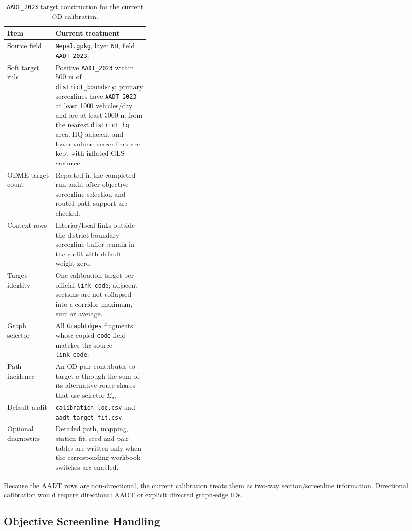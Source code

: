 \documentclass[11pt,a4paper]{article}
\begin{document}
\begin{table}[H]
\centering
\caption{\texttt{AADT\_2023} target construction for the current OD calibration.}
\begin{tabularx}{\linewidth}{p{0.34\linewidth} X}
\toprule
\textbf{Item} & \textbf{Current treatment} \\
\midrule
Source field & \texttt{Nepal.gpkg}, layer \texttt{NH}, field
\texttt{AADT\_2023}. \\
Soft target rule & Positive \texttt{AADT\_2023} within 500 m of
\texttt{district\_boundary}; primary screenlines have
\texttt{AADT\_2023} at least 1000 vehicles/day and are at least 3000 m from the
nearest \texttt{district\_hq} area. HQ-adjacent and lower-volume screenlines are
kept with inflated GLS variance. \\
ODME target count & Reported in the completed run audit after objective
screenline selection and routed-path support are checked. \\
Context rows & Interior/local links outside the district-boundary screenline
buffer remain in the audit with default weight zero. \\
Target identity & One calibration target per official \texttt{link\_code};
adjacent sections are not collapsed into a corridor maximum, sum or average. \\
Graph selector & All \texttt{GraphEdges} fragments whose copied
\texttt{code} field matches the source \texttt{link\_code}. \\
Path incidence & An OD pair contributes to target $a$ through the sum of its
alternative-route shares that use selector $E_a$. \\
Default audit & \texttt{calibration\_log.csv} and
\texttt{aadt\_target\_fit.csv}. \\
Optional diagnostics & Detailed path, mapping, station-fit, seed and pair
tables are written only when the corresponding workbook switches are enabled. \\
\bottomrule
\end{tabularx}
\end{table}

Because the AADT rows are non-directional, the current calibration treats them
as two-way section/screenline information. Directional calibration would require
directional AADT or explicit directed graph-edge IDs.

\subsection{Objective Screenline Handling}
\end{document}
